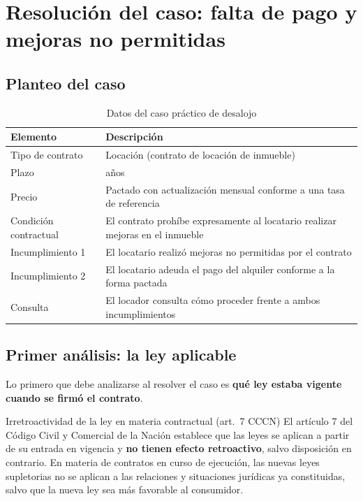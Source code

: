 \documentclass[12pt,oneside]{book}
\begin{document}
\section{Resoluci\'on del caso: falta de pago y mejoras no permitidas}

\subsection{Planteo del caso}

\begin{table}[H]
\centering
\begin{tabularx}{\textwidth}{
    >{\raggedright\arraybackslash}p{}
    >{\raggedright\arraybackslash}X
}
\toprule
\textbf{Elemento} & \textbf{Descripción} \\
\midrule
Tipo de contrato & Locación (contrato de locación de inmueble) \\
Plazo & 10 años \\
Precio & Pactado con actualización mensual conforme a una tasa de referencia \\
Condición contractual & El contrato prohíbe expresamente al locatario realizar mejoras en el inmueble \\
Incumplimiento 1 & El locatario realizó mejoras no permitidas por el contrato \\
Incumplimiento 2 & El locatario adeuda el pago del alquiler conforme a la forma pactada \\
Consulta & El locador consulta cómo proceder frente a ambos incumplimientos \\
\bottomrule
\end{tabularx}
\caption{Datos del caso práctico de desalojo}
\end{table}

\subsection{Primer an\'alisis: la ley aplicable}

Lo primero que debe analizarse al resolver el caso es
\textbf{qué ley estaba vigente cuando se firmó el contrato}.

\begin{normref}{Irretroactividad de la ley en materia contractual (art.\ 7 CCCN)}
El artículo 7 del Código Civil y Comercial de la Nación establece que
las leyes se aplican a partir de su entrada en vigencia y \textbf{no
tienen efecto retroactivo}, salvo disposición en contrario. En materia
de contratos en curso de ejecución, las nuevas leyes supletorias no se
aplican a las relaciones y situaciones jurídicas ya constituidas, salvo
que la nueva ley sea más favorable al consumidor.
\end{normref}
\end{document}
